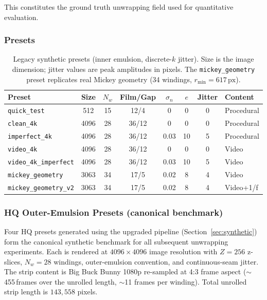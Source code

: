 \documentclass[11pt,a4paper]{article}
\begin{document}
This constitutes the ground truth unwrapping field used for quantitative evaluation.

\subsubsection{Presets}

\begin{table}[H]
\centering
\small
\begin{tabular}{lccccccl}
\toprule
Preset & Size & $N_w$ & Film/Gap & $\sigma_n$ & $e$ & Jitter & Content \\
\midrule
\texttt{quick\_test} & 512 & 15 & 12/4 & 0 & 0 & 0 & Procedural \\
\texttt{clean\_4k} & 4096 & 28 & 36/12 & 0 & 0 & 0 & Procedural \\
\texttt{imperfect\_4k} & 4096 & 28 & 36/12 & 0.03 & 10 & 5 & Procedural \\
\texttt{video\_4k} & 4096 & 28 & 36/12 & 0 & 0 & 0 & Video \\
\texttt{video\_4k\_imperfect} & 4096 & 28 & 36/12 & 0.03 & 10 & 5 & Video \\
\texttt{mickey\_geometry} & 3063 & 34 & 17/5 & 0.02 & 8 & 4 & Video \\
\texttt{mickey\_geometry\_v2} & 3063 & 34 & 17/5 & 0.02 & 8 & 4 & Video+1/f \\
\bottomrule
\end{tabular}
\caption{Legacy synthetic presets (inner emulsion, discrete-$k$ jitter). Size is the image dimension; jitter values are peak amplitudes in pixels. The \texttt{mickey\_geometry} preset replicates real Mickey geometry (34 windings, $r_{\min}=617\,\text{px}$).}
\label{tab:presets}
\end{table}

\subsubsection{HQ Outer-Emulsion Presets (canonical benchmark)}
\label{sec:hq_outer_presets}

Four HQ presets generated using the upgraded pipeline (Section~\ref{sec:synthetic}) form the canonical synthetic benchmark for all subsequent unwrapping experiments. Each is rendered at $4096{\times}4096$ image resolution with $Z=256$ z-slices, $N_w=28$ windings, outer-emulsion convention, and continuous-seam jitter. The strip content is Big Buck Bunny 1080p re-sampled at 4:3 frame aspect ($\sim$455\,frames over the unrolled length, $\sim$11 frames per winding). Total unrolled strip length is $143{,}558$ pixels.
\end{document}
